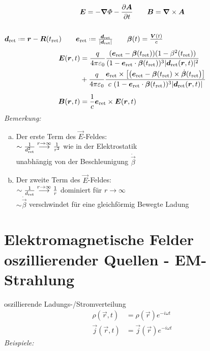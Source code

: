 \begin{equation*}
\bm{E} = - \bm{\nabla} \varPhi - \frac{\partial \bm{A}}{\partial t} \qquad \bm{B} = \bm{\nabla} \times \bm{A}
\end{equation*}
\\
%
%
%
%
%
%
$ \vec{d}_{\tx{ret}} \defeq \vec{r} - \vec{R}(t_{\tx{ret}}) \qquad \vec{e}_{\tx{ret}} \defeq \frac{\vec{d}_{\tx{ret}}}{|\vec{d}_{\tx{ret}}|} \qquad \vec{\beta}(t) = \frac{\vec{V}(t)}{c} $
\begin{align*}
\bm{E}(\bm{r},t) &= \frac{q}{4 \pi \varepsilon_0} \frac{(\bm{e}_{\textrm{ret}} - \bm{\beta}(t_{\textrm{ret}})) ( 1 - \beta^2 (t_{\textrm{ret}}) )}{(1 - \bm{e}_{\textrm{ret}} \cdot \bm{\beta}(t_{\textrm{ret}}))^3 |\bm{d}_{\textrm{ret}}(\bm{r},t)|^2}\\
&+ \frac{q}{4 \pi \varepsilon_0} \frac{\bm{e}_{\textrm{ret}} \times \left[\left(\bm{e}_{\textrm{ret}} - \bm{\beta}(t_{\textrm{ret}}) \times \dot{\bm{\beta}}(t_{\textrm{ret}}\right)\right]}{c \ ( 1 - \bm{e}_{\textrm{ret}} \cdot \bm{\beta}(t_{\textrm{ret}}))^3 |\bm{d}_{\textrm{ret}}(\bm{r},t)|}\\[5pt]
\bm{B}(\bm{r},t) &= \frac{1}{c} \bm{e}_{\textrm{ret}} \times \bm{E}(\bm{r},t)
\end{align*}
\emph{Bemerkung:}
\begin{enumerate}[a)]
	\item Der erste Term des $ \vec{E} $-Feldes:\\
	$ \sim \frac{1}{d_{\textrm{ret}}^2} \overset{r \to \infty}{\longrightarrow} \frac{1}{r^2} $ wie in der Elektrostatik\\
	unabhängig von der Beschleunigung $ \dot{\vec{\beta}} $
	\item Der zweite Term des $ \vec{E} $-Feldes:\\
	$ \sim \frac{1}{d_{\textrm{ret}}} \overset{r \to \infty}{\longrightarrow} \frac{1}{r} $ dominiert für $ r \to \infty $\\[5pt]
	$ \sim \dot{\vec{\beta}} $ verschwindet für eine gleichförmig Bewegte Ladung
\end{enumerate}


\section{Elektromagnetische Felder oszillierender Quellen - EM-Strahlung}

oszillierende Ladungs-/Stromverteilung
\begin{align*}
\rho(\vec{r},t) &= \rho(\vec{r}) e^{- i \omega t}\\
\vec{j}(\vec{r},t) &= \vec{j}(\vec{r}) e^{- i \omega t}
\end{align*}
\emph{Beispiele:}
%
%
%
%
%
%

